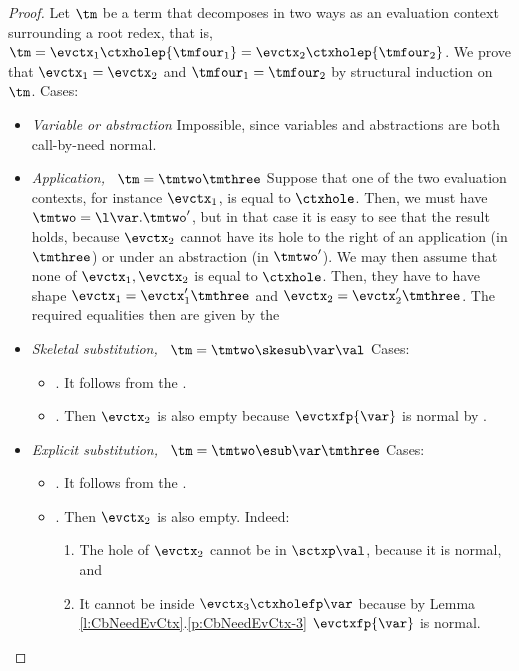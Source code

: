 \begin{proof}
Let $\tm$ be a term that decomposes in two ways as an evaluation context surrounding a root redex, that is, $\tm=\evctx_1\ctxholep{\tmfour_1}=\evctx_2\ctxholep{\tmfour_2}$. We prove that $\evctx_1=\evctx_2$ and $\tmfour_1=\tmfour_2$ by structural induction on $\tm$. Cases:
\begin{itemize}
 \item \emph{Variable or abstraction}
 Impossible, since variables and abstractions are both call-by-need normal.
 
 \item \emph{Application, \ie\ $\tm=\tmtwo\tmthree$} Suppose that one of the two evaluation contexts, for instance $\evctx_1$, is equal to $\ctxhole$. Then, we must have $\tmtwo=\l\var.\tmtwo'$, but in that case it is easy to see that the result holds, because $\evctx_2$ cannot have its hole to the right of an application (in $\tmthree$) or under an abstraction (in $\tmtwo'$). We may then assume that none of $\evctx_1,\evctx_2$ is equal to $\ctxhole$. Then, they have to have shape $\evctx_1=\evctx_1'\tmthree$ and $\evctx_2=\evctx_2'\tmthree$. The required equalities then are given by the \ih
  
 \item \emph{Skeletal substitution, \ie\ $\tm=\tmtwo\skesub\var\val$}  Cases:
 \begin{itemize}
 \item {}. It follows from the \ih. 
 
 \item {}. Then $\evctx_2$ is also empty because $\evctxfp{\var}$ is normal by .
\end{itemize}
    
 \item \emph{Explicit substitution, \ie\ $\tm=\tmtwo\esub\var\tmthree$}
 Cases:
 \begin{itemize}
 \item {}. It follows from the \ih. 
 
 \item {}. Then $\evctx_2$ is also empty. Indeed:
 \begin{enumerate}
 \item The hole of $\evctx_2$ cannot be in $\sctxp\val$, because it is normal, and 
 \item It cannot be inside $\evctx_3\ctxholefp\var$ because by Lemma \ref{l:CbNeedEvCtx}.\ref{p:CbNeedEvCtx-3} $\evctxfp{\var}$ is normal.
 \end{enumerate}
 

\end{itemize}
\end{itemize}
\end{proof}

